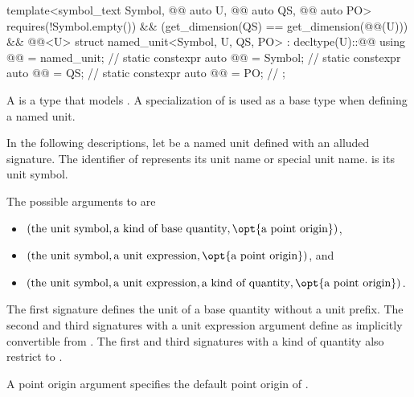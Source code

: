 \begin{codeblock}
{template<symbol_text Symbol, @@ auto U, @@ auto QS,
         @@ auto PO>
  requires(!Symbol.empty()) &&
          (get_dimension(QS) == get_dimension(@@(U))) &&
          @@<U>
struct named_unit<Symbol, U, QS, PO> : decltype(U)::@@ {
  using @@ = named_unit;              // \expos
  static constexpr auto @@ = Symbol;     // \expos
  static constexpr auto @@ = QS;  // \expos
  static constexpr auto @@ = PO;   // \expos
};

}
\end{codeblock}

\pnum
A  is a type that models .
A specialization of  is used as a base type when defining a named unit.

\pnum
In the following descriptions, let  be a named unit defined with an alluded signature.
The identifier of  represents
its unit name
or special unit name.
 is its unit symbol.

\pnum
The possible arguments to  are
\begin{itemize}
\item
$(\text{the unit symbol}, \text{a kind of base quantity}, \opt{\text{a point origin}})$,
\item
$(\text{the unit symbol}, \text{a unit expression}, \opt{\text{a point origin}})$, and
\item
$(\text{the unit symbol}, \text{a unit expression}, \text{a kind of quantity}, \opt{\text{a point origin}})$.
\end{itemize}

\pnum
The first signature defines the unit of a base quantity
without a unit prefix.
The second and third signatures with a unit expression argument 
define  as implicitly convertible from .
The first and third signatures with a kind of quantity 
also restrict  to .

\pnum
A point origin argument specifies the default point origin of .

